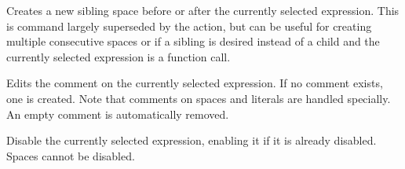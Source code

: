Creates a new sibling space before or after the currently selected
expression. This is command largely superseded by the
\hyperref[cmd:smart_space]{} \keys{\SPACE} action, but can be
useful for creating multiple consecutive spaces or if a sibling is desired
instead of a child and the currently selected expression is a function call.

Edits the comment on the currently selected expression. If no comment exists,
one is created. Note that comments on spaces and literals are handled
specially. An empty comment is automatically removed.

Disable the currently selected expression, enabling it if it is already
disabled. Spaces cannot be disabled.

